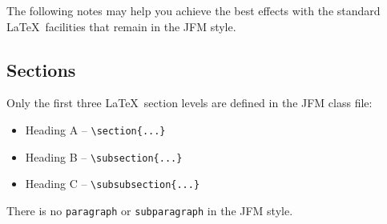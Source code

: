 \documentclass{jfm}
\begin{document}
The following notes may help you achieve the best effects with the
standard \LaTeX\ facilities that remain in the JFM style.

\subsection{Sections}

Only the first three \LaTeX\ section levels are defined in the JFM class
file:
\begin{itemize}
  \item[] Heading A -- \verb"\section{...}"
  \item[] Heading B -- \verb"\subsection{...}"
  \item[] Heading C -- \verb"\subsubsection{...}"
\end{itemize}
There is no \verb"paragraph" or \verb"subparagraph" in the JFM style.
\end{document}
